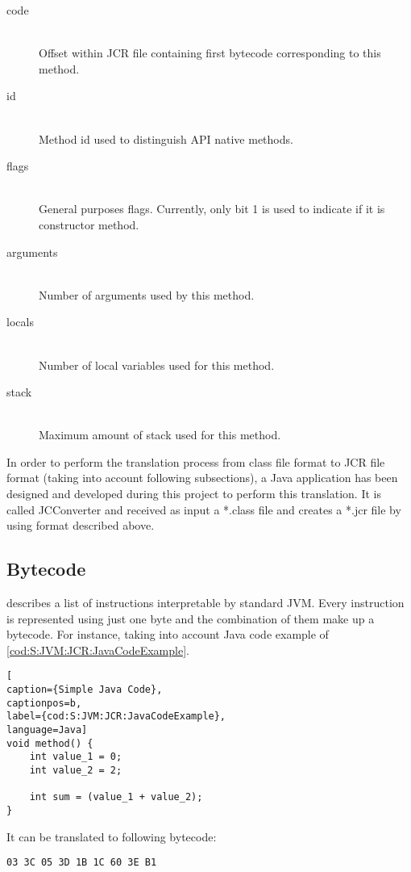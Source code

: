 \begin{description}
\item[code] \hfill \\
Offset within JCR file containing first bytecode corresponding to this method.
\item[id] \hfill \\
Method id used to distinguish API native methods.
\item[flags] \hfill \\
General purposes flags. Currently, only bit 1 is used to indicate if it is constructor method.
\item[arguments] \hfill \\
Number of arguments used by this method.
\item[locals] \hfill \\
Number of local variables used for this method.
\item[stack] \hfill \\
Maximum amount of stack used for this method.
\end{description}

In order to perform the translation process from class file format to JCR file format (taking into account following subsections), a Java application has been designed and developed during this project to perform this translation. It is called JCConverter and received as input a *.class file and creates a *.jcr file by using format described above.

\subsection{Bytecode}\label{SS:JVM:JCR:Bytecode}
\cite{Art:JVMSE7} describes a list of instructions interpretable by standard JVM. Every instruction is represented using just one byte and the combination of them make up a bytecode. For instance, taking into account Java code example of \ref{cod:S:JVM:JCR:JavaCodeExample}.

\medskip
\begin{lstlisting}[
caption={Simple Java Code},
captionpos=b,
label={cod:S:JVM:JCR:JavaCodeExample},
language=Java]
void method() {
    int value_1 = 0;
    int value_2 = 2;

    int sum = (value_1 + value_2);
}
\end{lstlisting}
\medskip

It can be translated to following bytecode:

\medskip
\begin{lstlisting}
03 3C 05 3D 1B 1C 60 3E B1
\end{lstlisting}
\medskip

